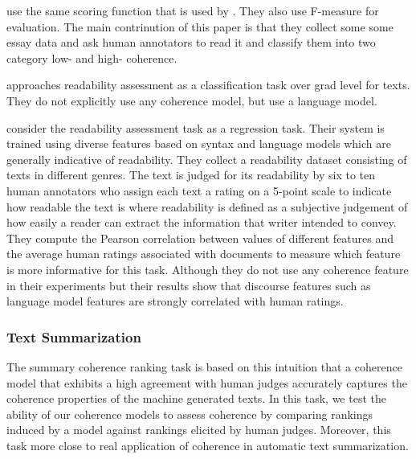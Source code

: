  use the same scoring function that is used by . 
They also use F-measure for evaluation. 
The main contrinution of this paper is that they collect some some essay data and ask human annotators to read it and classify them into two category low- and high- coherence. 

 approaches readability assessment as a classification task over grad level for texts. They do not explicitly use any coherence model, but use a language model. 

 consider the readability assessment task as a regression task. 
Their system is trained using diverse features based on syntax and language models which are generally indicative of readability. 
They collect a readability dataset consisting of texts in different genres. 
The text  is judged for its readability by six to ten human annotators who assign each text a rating on a 5-point scale to indicate how readable the text is where readability is defined as a subjective judgement of how easily a reader can extract the information that writer intended to convey. 
They compute the Pearson correlation between values of different features and the average human ratings associated with documents to measure which feature is more informative for this task. 
Although they do not use any coherence feature in their experiments but their results show that discourse features such as language model features are strongly correlated with human ratings. 


\subsubsection{Text Summarization}
The summary coherence ranking task is based on this intuition that a coherence model that exhibits a high agreement with human judges accurately captures the coherence properties of the machine generated texts. 
In this task, we test the ability of our coherence models to assess coherence by comparing rankings induced by a model against rankings elicited by human judges. 
Moreover, this task more close to real application of coherence in automatic text summarization.

